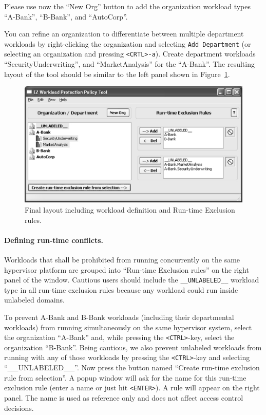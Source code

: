 \documentclass[11pt,twoside,final,openright]{report}
\begin{document}
Please use now the ``New Org'' button to add the organization workload types
``A-Bank'', ``B-Bank'', and ``AutoCorp''.

You can refine an organization to differentiate between multiple
department workloads by right-clicking the organization and selecting
\verb|Add Department| (or selecting an organization and pressing
\verb|<CRTL>-a|). Create department workloads ``SecurityUnderwriting'',
and ``MarketAnalysis'' for the ``A-Bank''. The resulting layout of the
tool should be similar to the left panel shown in
Figure~\ref{fig:acmezpolicy}.

\begin{figure}[htb]
\centering
\includegraphics[width=13cm]{figs/acm_ezpolicy_gui.eps}
\caption{Final layout including workload definition and Run-time Exclusion rules.}
\label{fig:acmezpolicy}
\end{figure}

\paragraph{Defining run-time conflicts.} Workloads that shall be
prohibited from running concurrently on the same hypervisor platform
are grouped into ``Run-time Exclusion rules'' on the right panel of
the window. Cautious users should include the \verb|__UNLABELED__|
workload type in all run-time exclusion rules because any workload
could run inside unlabeled domains.

To prevent A-Bank and B-Bank workloads (including their
departmental workloads) from running simultaneously on the same
hypervisor system, select the organization ``A-Bank'' and, while
pressing the \verb|<CTRL>|-key, select the organization ``B-Bank''.
Being cautious, we also prevent unlabeled workloads from running with
any of those workloads by pressing the \verb|<CTRL>|-key and selecting
``\_\_UNLABELED\_\_''. Now press the button named ``Create run-time exclusion
rule from selection''. A popup window will ask for the name for this run-time
exclusion rule (enter a name or just hit \verb|<ENTER>|). A rule will
appear on the right panel. The name is used as reference only and does
not affect access control decisions.
\end{document}
